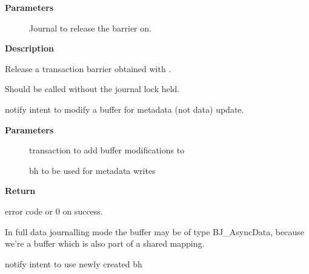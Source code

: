 \documentclass[a4paper,8pt,english]{sphinxmanual}
\begin{document}
\textbf{Parameters}
\begin{description}
\item[{}] \leavevmode
Journal to release the barrier on.

\end{description}

\textbf{Description}

Release a transaction barrier obtained with {\hyperref[filesystems/index:c.jbd2_journal_lock_updates]{\emph{}}}.

Should be called without the journal lock held.

\begin{fulllineitems}
\label{filesystems/index:c.jbd2_journal_get_write_access}
notify intent to modify a buffer for metadata (not data) update.

\end{fulllineitems}


\textbf{Parameters}
\begin{description}
\item[{}] \leavevmode
transaction to add buffer modifications to

\item[{}] \leavevmode
bh to be used for metadata writes

\end{description}

\textbf{Return}

error code or 0 on success.

In full data journalling mode the buffer may be of type BJ\_AsyncData,
because we're  a buffer which is also part of a shared mapping.

\begin{fulllineitems}
\label{filesystems/index:c.jbd2_journal_get_create_access}
notify intent to use newly created bh

\end{fulllineitems}
\end{document}
